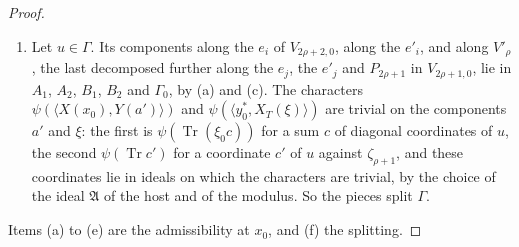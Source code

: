 \begin{proof}
\begin{enumerate}
  $V'_\rho$ and $P_{2\rho+1}$, by (a). So $\Gamma_0$ consists of finite elements.
  The lattice of a pair of self-dual lattices has a nonzero lattice vacuum, by a
  computation in the model of Definition~\ref{th-weil-datum}, and a lattice
  vacuum for a subgroup is one for each of its subgroups; so $\Gamma_0$ has a
  nonzero lattice vacuum.
\item[(f)] Let $u\in\Gamma$. Its components along the $e_i$ of $V_{2\rho+2,0}$,
  along the $e'_i$, and along $V'_\rho$, the last decomposed further along the
  $e_j$, the $e'_j$ and $P_{2\rho+1}$ in $V_{2\rho+1,0}$, lie in $A_1$, $A_2$,
  $B_1$, $B_2$ and $\Gamma_0$, by (a) and (c). The characters
  $\psi(\langle X(x_0),Y(a')\rangle)$ and $\psi(\langle y_0^*,X_T(\xi)\rangle)$
  are trivial on the components $a'$ and $\xi$: the first is
  $\psi(\operatorname{Tr}(\xi_0c))$ for a sum $c$ of diagonal coordinates of $u$,
  the second $\psi(\operatorname{Tr}c')$ for a coordinate $c'$ of $u$ against
  $\zeta_{\rho+1}$, and these coordinates lie in ideals on which the characters
  are trivial, by the choice of the ideal $\mathfrak A$ of the host and of the
  modulus. So the pieces split $\Gamma$.
\end{enumerate}
Items (a) to (e) are the admissibility at $x_0$, and (f) the splitting.
\end{proof}

